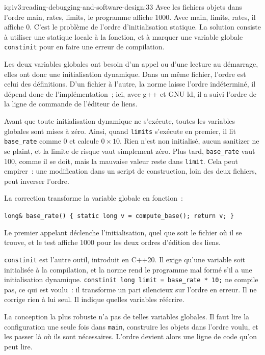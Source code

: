 \begin{solution}{iq:iv3:reading-debugging-and-software-design:33}
Avec les fichiers objets dans l'ordre main, rates, limits, le programme affiche 1000. Avec main, limits, rates, il affiche 0. C'est le problème de l'ordre d'initialisation statique. La solution consiste à utiliser une statique locale à la fonction, et à marquer une variable globale \texttt{constinit} pour en faire une erreur de compilation.

Les deux variables globales ont besoin d'un appel ou d'une lecture au démarrage, elles ont donc une initialisation dynamique. Dans un même fichier, l'ordre est celui des définitions. D'un fichier à l'autre, la norme laisse l'ordre indéterminé, il dépend donc de l'implémentation~; ici, avec g++ et GNU ld, il a suivi l'ordre de la ligne de commande de l'éditeur de liens.

Avant que toute initialisation dynamique ne s'exécute, toutes les variables globales sont mises à zéro. Ainsi, quand \texttt{limits} s'exécute en premier, il lit \texttt{base\_rate} comme 0 et calcule $0 \times 10$. Rien n'est non initialisé, aucun sanitizer ne se plaint, et la limite de risque vaut simplement zéro. Plus tard, \texttt{base\_rate} vaut 100, comme il se doit, mais la mauvaise valeur reste dans \texttt{limit}. Cela peut empirer~: une modification dans un script de construction, loin des deux fichiers, peut inverser l'ordre.

La correction transforme la variable globale en fonction~:

\texttt{long\& base\_rate() \{ static long v = compute\_base(); return v; \}}

Le premier appelant déclenche l'initialisation, quel que soit le fichier où il se trouve, et le test affiche 1000 pour les deux ordres d'édition des liens.

\texttt{constinit} est l'autre outil, introduit en C++20. Il exige qu'une variable soit initialisée à la compilation, et la norme rend le programme mal formé s'il a une initialisation dynamique. \texttt{constinit long limit = base\_rate * 10;} ne compile pas, ce qui est voulu~: il transforme un pari silencieux sur l'ordre en erreur. Il ne corrige rien à lui seul. Il indique quelles variables réécrire.

La conception la plus robuste n'a pas de telles variables globales. Il faut lire la configuration une seule fois dans \texttt{main}, construire les objets dans l'ordre voulu, et les passer là où ils sont nécessaires. L'ordre devient alors une ligne de code qu'on peut lire.


\end{solution}

